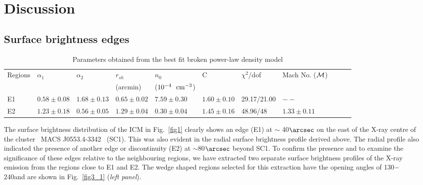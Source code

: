 \documentclass[useASM,usenatbib]{mn2e}
\newcommand{\mac}{\rm~MACS J0553.4-3342}
\begin{document}
\section{Discussion}
\subsection{Surface brightness edges} 


\begin{table*}
\caption{Parameters obtained from the best fit broken power-law density model}
\centering
\small
\begin{tabular}{lllllllllll}\hline
Regions &$\alpha_1$& $\alpha_2$ & $r_{sh}$ & $n_0$ & C &$\chi^{2}$/dof   & Mach No. (${\cal M}$)   \\
&&&(arcmin)&($10^{-4}~{~\rm cm^{-3}}$)& &    \\ \hline
E1 &$0.58\pm0.08$&$1.68\pm0.13$&$0.65\pm0.02$&$7.59\pm0.30$&$1.60\pm0.10$&29.17/21.00&$--$\\ 
E2 &$1.23\pm0.18$ &$0.56\pm0.05$&$1.29\pm0.04$&$0.30\pm0.04$&$1.45\pm0.16$&48.96/48&$1.33\pm0.11$\\  \hline
\end{tabular}
\label{fit}
\end{table*}

The surface brightness distribution of the ICM in Fig.~\ref{fig1} clearly
shows an edge (E1) at $\sim$ 40$\arcsec$ on the east of the X-ray
centre of the cluster \mac~ (SC1). This was also evident in the radial
surface brightness profile derived above. The radial
profile also indicated the  presence of another edge or discontinuity (E2)
at $\sim$80$\arcsec$ beyond SC1. To confirm the
presence and to examine the significance of these edges relative to
the neighbouring regions, we have extracted two separate surface
brightness profiles of the X-ray emission from the regions close to E1
and E2. The wedge shaped regions selected for this extraction have the
opening angles of 130\degr $-$ 240\degr and are shown in
Fig.~\ref{fig3_1} ({\it left panel}).
\end{document}
